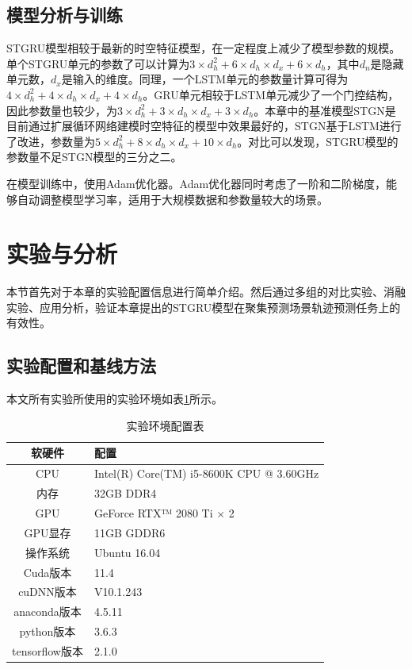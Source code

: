 \documentclass[master]{thesis-uestc}
\begin{document}
\subsection{模型分析与训练}
STGRU模型相较于最新的时空特征模型，在一定程度上减少了模型参数的规模。单个STGRU单元的参数了可以计算为$3 \times d_h^2+6 \times d_h \times d_x+6 \times d_h$，其中$d_n$是隐藏单元数，$d_x$是输入的维度。同理，一个LSTM单元的参数量计算可得为$4 \times d_h^2+4 \times d_h \times d_x+4 \times d_h$。GRU单元相较于LSTM单元减少了一个门控结构，因此参数量也较少，为$3 \times d_h^2+3 \times d_h \times d_x+3 \times d_h$。本章中的基准模型STGN是目前通过扩展循环网络建模时空特征的模型中效果最好的，STGN基于LSTM进行了改进，参数量为$5 \times d_h^2+8 \times d_h \times d_x+10 \times d_h$。对比可以发现，STGRU模型的参数量不足STGN模型的三分之二。

在模型训练中，使用Adam优化器。Adam优化器同时考虑了一阶和二阶梯度，能够自动调整模型学习率，适用于大规模数据和参数量较大的场景。

\section{实验与分析}
本节首先对于本章的实验配置信息进行简单介绍。然后通过多组的对比实验、消融实验、应用分析，验证本章提出的STGRU模型在聚集预测场景轨迹预测任务上的有效性。

\subsection{实验配置和基线方法}
\label{实验配置}
本文所有实验所使用的实验环境如表\ref{Table.3.1}所示。
\begin{table}[!ht]
\centering
\caption{实验环境配置表}%
\label{Table.3.1}
\begin{tabular}{cl}
\toprule[1.5pt]
软硬件& 配置\\
\midrule[0.75pt]
CPU& Intel(R) Core(TM) i5-8600K CPU @ 3.60GHz\\
内存& 32GB DDR4\\
GPU&  GeForce RTX™ 2080 Ti $\times$ 2\\
GPU显存& 11GB GDDR6\\
操作系统& Ubuntu 16.04\\
Cuda版本& 11.4\\
cuDNN版本& V10.1.243\\
anaconda版本& 4.5.11\\
python版本& 3.6.3\\
tensorflow版本& 2.1.0\\
\bottomrule[1.5pt]
\end{tabular}
\end{table}
\end{document}
